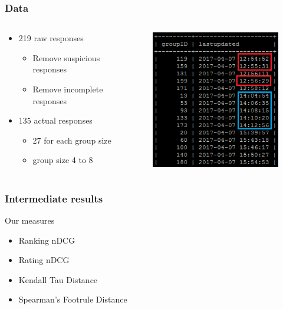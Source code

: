 \begin{frame}
\frametitle{Data}
\begin{columns}
	\begin{column}{0.5\textwidth}
		\begin{itemize}
			\item 219 raw responses
			\begin{itemize}
				\item Remove suspicious responses
				\item Remove incomplete responses
			\end{itemize}
			\item 135 actual responses
			\begin{itemize}
				\item 27 for each group size
				\item group size 4 to 8
			\end{itemize}
		\end{itemize}
	\end{column}
	\begin{column}{0.5\textwidth}
		\begin{figure}
			\centering
			\includegraphics[scale=.5]{graphics/survey_lastupdated.png}
		\end{figure}
	\end{column}
\end{columns}
\end{frame}

\begin{frame}
\frametitle{Intermediate results}
Our measures
\begin{itemize}
	\item Ranking nDCG
	\item Rating nDCG
	\item Kendall Tau Distance
	\item Spearman's Footrule Distance
\end{itemize}
\end{frame}


